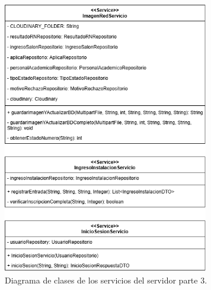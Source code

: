 \begin{figure}[htbp!]
	\begin{center}
		\includegraphics[width=0.8\textwidth]{Clases/Servicio3.png}
		\caption{Diagrama de clases de los servicios del servidor parte 3.}
		\label{fig:DS3}
	\end{center}
\end{figure}

